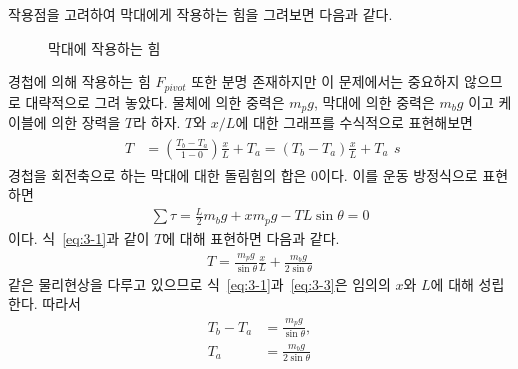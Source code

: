 \documentclass[floatfix,nofootinbib,superscriptaddress,fleqn]{revtex4-2}
\begin{document}
작용점을 고려하여 막대에게 작용하는 힘을 그려보면 다음과 같다.
\begin{figure}[htbp]
  \centering
  \caption{막대에 작용하는 힘}
\end{figure} 경첩에 의해 작용하는 힘 $F_{pivot}$ 또한 분명 존재하지만 
이 문제에서는 중요하지 않으므로 대략적으로 그려 놓았다.
물체에 의한 중력은 $m_{p}g$, 막대에 의한 중력은 $m_{b}g$ 이고
케이블에 의한 장력을 $T$라 하자. $T$와 $x/L$에 대한
그래프를 수식적으로 표현해보면
\begin{align}\label{eq:3-1}
  \begin{split}
    T &= \left(\frac{T_b - T_a}{1-0}\right)\frac{x}{L}+T_a
    =\left(T_b - T_a\right)\frac{x}{L}+T_a  
  \end{split}s
\end{align}
경첩을 회전축으로 하는 막대에 대한 돌림힘의 합은 0이다. 
이를 운동 방정식으로 표현하면
\begin{align}\label{eq:3-2}
  \sum \tau = \frac{L}{2}m_{b}g + xm_{p}g-TL\sin\theta=0
\end{align}
이다.
식~\eqref{eq:3-1}과 같이 $T$에 대해 표현하면 다음과 같다.
\begin{align}\label{eq:3-3}
  T = \frac{m_{p}g}{\sin\theta}\frac{x}{L}
  +\frac{m_{b}g}{2\sin\theta}
\end{align}
같은 물리현상을 다루고 있으므로 식~\eqref{eq:3-1}과~\eqref{eq:3-3}은 
임의의 $x$와 $L$에 대해 성립한다. 따라서
\begin{align}
  \label{eq:3-3-1}T_b - T_a &= \frac{m_{p}g}{\sin\theta},  \\
  \label{eq:3-3-2}T_a &= \frac{m_{b}g}{2\sin\theta}
\end{align}
\end{document}
